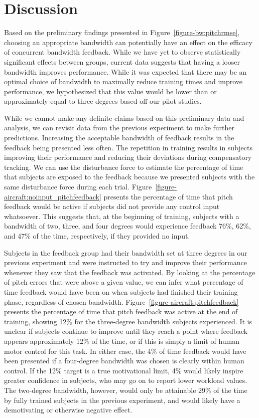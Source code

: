 \section{Discussion}

Based on the preliminary findings presented in Figure~\ref{figure-bw:pitchrmse}, choosing an appropriate bandwidth can potentially have an effect on the efficacy of concurrent bandwidth feedback.
While we have yet to observe statistically significant effects between groups, current data suggests that having a looser bandwidth improves performance.
While it was expected that there may be an optimal choice of bandwidth to maximally reduce training times and improve performance, we hypothesized that this value would be lower than or approximately equal to three degrees based off our pilot studies.

While we cannot make any definite claims based on this preliminary data and analysis, we can revisit data from the previous experiment to make further predictions.
Increasing the acceptable bandwidth of feedback results in the feedback being presented less often.
The repetition in training results in subjects improving their performance and reducing their deviations during compensatory tracking.
We can use the disturbance force to estimate the percentage of time that subjects are exposed to the feedback because we presented subjects with the same disturbance force during each trial.
Figure~\ref{figure-aircraft:noinput_pitchfeedback} presents the percentage of time that pitch feedback would be active if subjects did not provide any control input whatsoever.
This suggests that, at the beginning of training, subjects with a bandwidth of two, three, and four degrees would experience feedback 76\%, 62\%, and 47\% of the time, respectively, if they provided no input.

Subjects in the feedback group had their bandwidth set at three degrees in our previous experiment and were instructed to try and improve their performance whenever they saw that the feedback was activated.
By looking at the percentage of pitch errors that were above a given value, we can infer what percentage of time feedback would have been on when subjects had finished their training phase, regardless of chosen bandwidth.
Figure~\ref{figure-aircraft:pitchfeedback} presents the percentage of time that pitch feedback was active at the end of training, showing 12\% for the three-degree bandwidth subjects experienced.
It is unclear if subjects continue to improve until they reach a point where feedback appears approximately 12\% of the time, or if this is simply a limit of human motor control for this task.
In either case, the 4\% of time feedback would have been presented if a four-degree bandwidth was chosen is clearly within human control.
If the 12\% target is a true motivational limit, 4\% would likely inspire greater confidence in subjects, who may go on to report lower workload values.
The two-degree bandwidth, however, would only be attainable 29\% of the time by fully trained subjects in the previous experiment, and would likely have a demotivating or otherwise negative effect.

